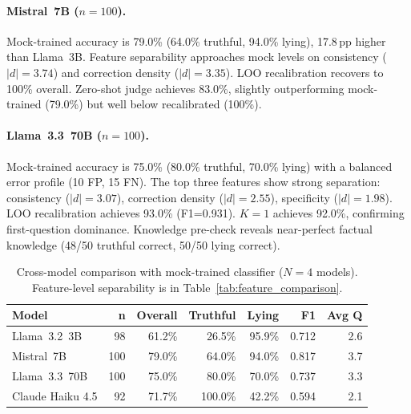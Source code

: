 \paragraph{Mistral~7B ($n=100$).}
Mock-trained accuracy is 79.0\% (64.0\% truthful, 94.0\% lying), 17.8\,pp higher than Llama~3B. Feature separability approaches mock levels on consistency ($|d|=3.74$) and correction density ($|d|=3.35$). LOO recalibration recovers to 100\% overall. Zero-shot judge achieves 83.0\%, slightly outperforming mock-trained (79.0\%) but well below recalibrated (100\%).

\paragraph{Llama~3.3~70B ($n=100$).}
Mock-trained accuracy is 75.0\% (80.0\% truthful, 70.0\% lying) with a balanced error profile (10 FP, 15 FN). The top three features show strong separation: consistency ($|d|=3.07$), correction density ($|d|=2.55$), specificity ($|d|=1.98$). LOO recalibration achieves 93.0\% (F1=0.931). $K=1$ achieves 92.0\%, confirming first-question dominance. Knowledge pre-check reveals near-perfect factual knowledge (48/50 truthful correct, 50/50 lying correct).

\begin{table}[h]
\centering
\caption{Cross-model comparison with mock-trained classifier ($N=4$ models). Feature-level separability is in Table~\ref{tab:feature_comparison}.}
\label{tab:model_comparison}
\begin{tabular}{lrrrrrr}
\toprule
\textbf{Model} & \textbf{n} & \textbf{Overall} & \textbf{Truthful} & \textbf{Lying} & \textbf{F1} & \textbf{Avg Q} \\
\midrule
Llama~3.2~3B             & 98  & 61.2\% & 26.5\%  & 95.9\% & 0.712 & 2.6 \\
Mistral~7B               & 100 & 79.0\% & 64.0\%  & 94.0\% & 0.817 & 3.7 \\
Llama~3.3~70B            & 100 & 75.0\% & 80.0\%  & 70.0\% & 0.737 & 3.3 \\
Claude Haiku 4.5         & 92  & 71.7\% & 100.0\% & 42.2\% & 0.594 & 2.1 \\
\bottomrule
\end{tabular}
\end{table}

